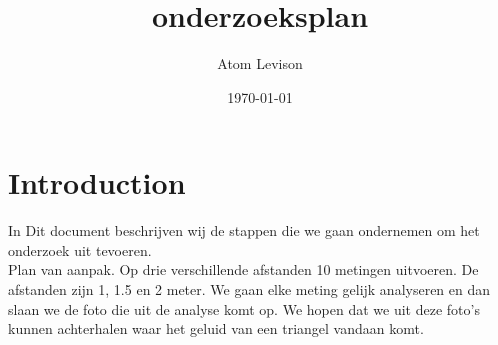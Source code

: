 \documentclass{article}
\title{onderzoeksplan}
\author{Atom Levison}
\date{\today}
\begin{document}
\maketitle

\section{Introduction}
In Dit document beschrijven wij de stappen die we gaan ondernemen om het onderzoek uit tevoeren.\\
Plan van aanpak. Op drie verschillende afstanden 10 metingen uitvoeren. De afstanden zijn 1, 1.5 en 2 meter. We gaan elke meting gelijk analyseren en dan slaan we de foto die uit de analyse komt op. We hopen dat we uit deze foto's kunnen achterhalen waar het geluid van een triangel vandaan komt.    
\end{document}
